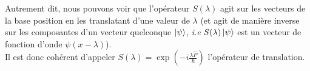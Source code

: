 \documentclass[../notesdecours]{subfiles}
\begin{document}
Autrement dit, nous pouvons voir que l'opérateur $S(\lambda)$ agit sur les vecteurs de la base position en les translatant d'une valeur de $\lambda$ (et agit de manière inverse sur les composantes d'un vecteur quelconque $\ket{\psi}$, \textit{i.e} $S(\lambda)\ket{\psi}$ est un vecteur de fonction d'onde $\psi(x-\lambda)$). \\
Il est donc cohérent d'appeler $S(\lambda) = \exp \left( -i \frac{\lambda \hat{P}}{\hbar} \right)$ l'opérateur de translation. 





\end{document}
